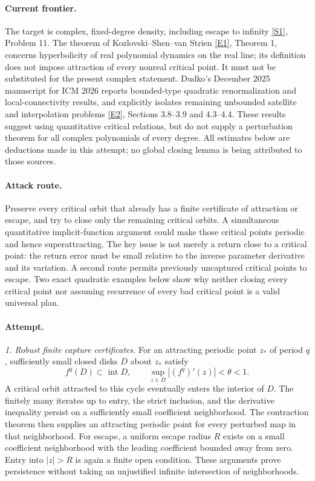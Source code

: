 \documentclass[11pt,a4paper]{article}
\newcommand{\sref}[2]{\hyperlink{source:#1:#2}{[S#2]}}
\newcommand{\eref}[2]{\hyperlink{extra:#1:#2}{[E#2]}}
\begin{document}
\paragraph{Current frontier.}
The target is complex, fixed-degree density, including escape to infinity
\sref{30006793}{1}, Problem 11. The theorem of Kozlovski--Shen--van Strien
\eref{30006793}{1}, Theorem 1, concerns hyperbolicity of real polynomial dynamics
on the real line; its definition does not impose attraction of every
nonreal critical point. It must not be substituted for the present
complex statement. Dudko's December 2025 manuscript for ICM 2026 reports
bounded-type quadratic renormalization and local-connectivity results,
and explicitly isolates remaining unbounded satellite and interpolation
problems \eref{30006793}{2}, Sections 3.8--3.9 and 4.3--4.4.
These results suggest using quantitative critical relations, but do not
supply a perturbation theorem for all complex polynomials of every degree.
All estimates below are deductions made in this attempt; no global closing
lemma is being attributed to those sources.

\paragraph{Attack route.}
Preserve every critical orbit that already has a finite certificate of
attraction or escape, and try to close only the remaining critical orbits.
A simultaneous quantitative implicit-function argument could make those
critical points periodic and hence superattracting. The key issue is not
merely a return close to a critical point: the return error must be small
relative to the inverse parameter derivative and its variation. A second
route permits previously uncaptured critical points to escape. Two exact
quadratic examples below show why neither closing every critical point nor
assuming recurrence of every bad critical point is a valid universal plan.

\paragraph{Attempt.}
\textit{1. Robust finite capture certificates.}
For an attracting periodic point $z_*$ of period $q$, sufficiently small
closed disks $D$ about $z_*$ satisfy
\[
 f^q(D)\subset\operatorname{int}D,
 \qquad \sup_{z\in D}|(f^q)'(z)|<\theta<1.                 \tag{215.1}
\]
A critical orbit attracted to this cycle eventually enters the interior
of $D$. The finitely many iterates up to entry, the strict inclusion, and
the derivative inequality persist on a sufficiently small coefficient
neighborhood. The contraction theorem then supplies an attracting
periodic point for every perturbed map in that neighborhood. For escape,
a uniform escape radius $R$ exists on a small coefficient neighborhood
with the leading coefficient bounded away from zero. Entry into
$|z|>R$ is again a finite open condition. These arguments prove persistence
without taking an unjustified infinite intersection of neighborhoods.
\end{document}
